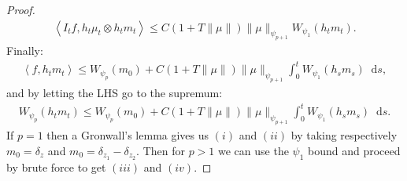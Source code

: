 \documentclass[11pt,a4paper]{article}
\newcommand{\brac}[1]{\left\langle#1\right\rangle}
\newcommand{\dd}{\mathop{}\!\mathrm{d}}
\begin{document}
\begin{proof}
\begin{align*}
        \brac{I_tf,h_t\mu_t \otimes h_t m_t} \leq C(1 + T\|\mu\|)\|\mu\|_{\psi_{p+1}} W_{\psi_1}(h_tm_t).
    \end{align*}
    Finally:
    \begin{align*}
        \brac{f,h_tm_t} \leq W_{\psi_p}(m_0) + C(1 + T\|\mu\|)\|\mu\|_{\psi_{p+1}}\int_0^t  W_{\psi_1}(h_sm_s)\dd s,
    \end{align*}
    and by letting the LHS go to the supremum:
    \begin{align*}
        W_{\psi_p}(h_tm_t) \leq W_{\psi_p}(m_0) + C(1 + T\|\mu\|)\|\mu\|_{\psi_{p+1}}\int_0^t  W_{\psi_1}(h_sm_s)\dd s.
    \end{align*}
    If $p = 1$ then a Gronwall's lemma gives us $(i)$ and $(ii)$ by taking respectively $m_0 = \delta_z$ and $m_0 = \delta_{z_1} -\delta_{z_2}$. Then for $p > 1$ we can use the $\psi_1$ bound and proceed by brute force to get $(iii)$ and $(iv)$.
\end{proof}
\end{document}
